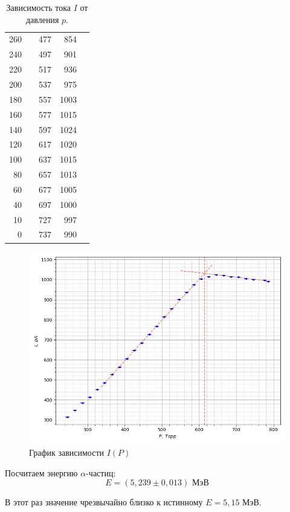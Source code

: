 \documentclass{article}
\begin{document}
\begin{enumerate}
\begin{table}[h!]
\begin{tabular}{|r|c|r|r|c|}
260 &  & 477 & 854  &  \\ \cline{1-1} \cline{3-4}
240 &  & 497 & 901  &  \\ \cline{1-1} \cline{3-4}
220 &  & 517 & 936  &  \\ \cline{1-1} \cline{3-4}
200 &  & 537 & 975  &  \\ \cline{1-1} \cline{3-4}
180 &  & 557 & 1003 &  \\ \cline{1-1} \cline{3-4}
160 &  & 577 & 1015 &  \\ \cline{1-1} \cline{3-4}
140 &  & 597 & 1024 &  \\ \cline{1-1} \cline{3-4}
120 &  & 617 & 1020 &  \\ \cline{1-1} \cline{3-4}
100 &  & 637 & 1015 &  \\ \cline{1-1} \cline{3-4}
80  &  & 657 & 1013 &  \\ \cline{1-1} \cline{3-4}
60  &  & 677 & 1005 &  \\ \cline{1-1} \cline{3-4}
40  &  & 697 & 1000 &  \\ \cline{1-1} \cline{3-4}
10  &  & 727 & 997  &  \\ \cline{1-1} \cline{3-4}
0   &  & 737 & 990  &  \\ \hline
\end{tabular}
\caption{Зависимость тока $I$ от давления $p$.}
\label{tab:3}
\end{table}

  
		\begin{figure}[h!]
			\centering
			\includegraphics[width=\linewidth]{P.png}
			\caption{График зависимости $I(P)$}
                \label{grap3}
		\end{figure}
	
		Посчитаем энергию $\alpha$-частиц:
		\begin{equation*}
			\boxed{E = (5,239 \pm 0,013) \text{ МэВ}}
		\end{equation*}
	
		В этот раз значение чрезвычайно близко к истинному $E = 5,15$ МэВ.
	
	\end{enumerate}
\end{document}
